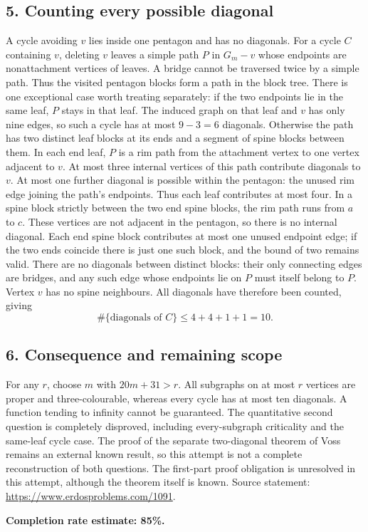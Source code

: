 \subsection*{5. Counting every possible diagonal}
A cycle avoiding $v$ lies inside one pentagon and has no diagonals. For a cycle $C$ containing $v$, deleting $v$ leaves a simple path $P$ in $G_m-v$ whose endpoints are nonattachment vertices of leaves. A bridge cannot be traversed twice by a simple path. Thus the visited pentagon blocks form a path in the block tree.
There is one exceptional case worth treating separately: if the two endpoints lie in the same leaf, $P$ stays in that leaf. The induced graph on that leaf and $v$ has only nine edges, so such a cycle has at most $9-3=6$ diagonals.
Otherwise the path has two distinct leaf blocks at its ends and a segment of spine blocks between them. In each end leaf, $P$ is a rim path from the attachment vertex to one vertex adjacent to $v$. At most three internal vertices of this path contribute diagonals to $v$. At most one further diagonal is possible within the pentagon: the unused rim edge joining the path's endpoints. Thus each leaf contributes at most four.
In a spine block strictly between the two end spine blocks, the rim path runs from $a$ to $c$. These vertices are not adjacent in the pentagon, so there is no internal diagonal. Each end spine block contributes at most one unused endpoint edge; if the two ends coincide there is just one such block, and the bound of two remains valid. There are no diagonals between distinct blocks: their only connecting edges are bridges, and any such edge whose endpoints lie on $P$ must itself belong to $P$. Vertex $v$ has no spine neighbours. All diagonals have therefore been counted, giving
\[
 \#\{\text{diagonals of }C\}\le4+4+1+1=10.
\]

\subsection*{6. Consequence and remaining scope}
For any $r$, choose $m$ with $20m+31>r$. All subgraphs on at most $r$ vertices are proper and three-colourable, whereas every cycle has at most ten diagonals. A function tending to infinity cannot be guaranteed. The quantitative second question is completely disproved, including every-subgraph criticality and the same-leaf cycle case. The proof of the separate two-diagonal theorem of Voss remains an external known result, so this attempt is not a complete reconstruction of both questions.
The first-part proof obligation is unresolved in this attempt, although the theorem itself is known.
Source statement: \url{https://www.erdosproblems.com/1091}.

\textbf{Completion rate estimate: 85\%.}

